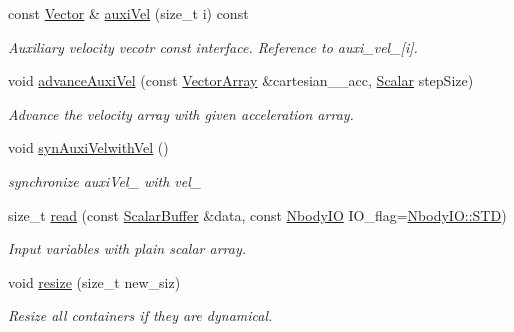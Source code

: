\begin{DoxyCompactItemize}
const \mbox{\hyperlink{class_space_h_1_1_vel_indep_particles_a61bbcfdb0dc7f99f3c68af69a755c935}{Vector}} \& \mbox{\hyperlink{class_space_h_1_1_vel_dep_chain_particles_a7b5b672b0b887799e3aed436509bd5b5}{auxi\+Vel}} (size\+\_\+t i) const
\begin{DoxyCompactList}\small\item\em Auxiliary velocity vecotr const interface. Reference to auxi\+\_\+vel\+\_\+\mbox{[}i\mbox{]}. \end{DoxyCompactList}\item 
void \mbox{\hyperlink{class_space_h_1_1_vel_dep_chain_particles_ac875237066008b4fa02feeacbbcb100a}{advance\+Auxi\+Vel}} (const \mbox{\hyperlink{class_space_h_1_1_vel_indep_particles_aa9983058940249df8b00fa800e8cbad2}{Vector\+Array}} \&cartesian_\+\_\+acc, \mbox{\hyperlink{class_space_h_1_1_vel_indep_particles_aeb47d8131b30ed790320ff634f0d6af1}{Scalar}} step\+Size)
\begin{DoxyCompactList}\small\item\em Advance the velocity array with given acceleration array. \end{DoxyCompactList}\item 
void \mbox{\hyperlink{class_space_h_1_1_vel_dep_chain_particles_a0d32d36439671d1c2344178d1d548567}{syn\+Auxi\+Velwith\+Vel}} ()
\begin{DoxyCompactList}\small\item\em synchronize auxi\+Vel\+\_\+ with vel\+\_\+ \end{DoxyCompactList}\item 
size\+\_\+t \mbox{\hyperlink{class_space_h_1_1_vel_dep_chain_particles_a901445956f76ea38574b2df3c45c77a1}{read}} (const \mbox{\hyperlink{class_space_h_1_1_vel_indep_particles_abca40159a816385790d5a6fd19c1dc6d}{Scalar\+Buffer}} \&data, const \mbox{\hyperlink{namespace_space_h_a296a8bae763a754564bfdce216e31b59}{Nbody\+IO}} I\+O\+\_\+flag=\mbox{\hyperlink{namespace_space_h_a296a8bae763a754564bfdce216e31b59ac6ce23be5d350ce18a665427d2d950f7}{Nbody\+I\+O\+::\+S\+TD}})
\begin{DoxyCompactList}\small\item\em Input variables with plain scalar array. \end{DoxyCompactList}\item 
void \mbox{\hyperlink{class_space_h_1_1_vel_dep_chain_particles_a8cc7751b890724be0bf72471cb65d761}{resize}} (size\+\_\+t new\+\_\+siz)
\begin{DoxyCompactList}\small\item\em Resize all containers if they are dynamical. \end{DoxyCompactList}\item 

\end{DoxyCompactItemize}
